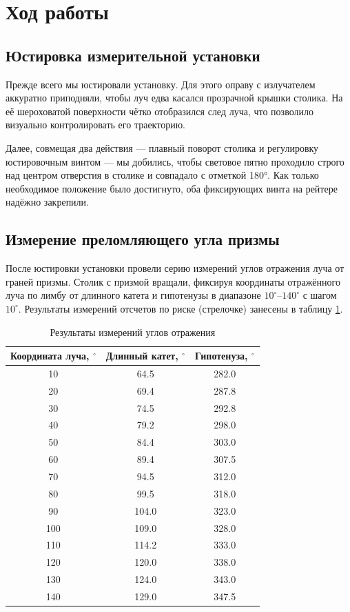 \section{Ход работы}

\subsection{Юстировка измерительной установки}

Прежде всего мы юстировали установку. Для этого оправу с излучателем аккуратно приподняли, чтобы луч едва касался прозрачной крышки столика. На её шероховатой поверхности чётко отобразился след луча, что позволило визуально контролировать его траекторию.

Далее, совмещая два действия — плавный поворот столика и регулировку юстировочным винтом — мы добились, чтобы световое пятно проходило строго над центром отверстия в столике и совпадало с отметкой 180°. Как только необходимое положение было достигнуто, оба фиксирующих винта на рейтере надёжно закрепили.

\subsection{Измерение преломляющего угла призмы}  
После юстировки установки провели серию измерений углов отражения луча от граней призмы. Столик с призмой вращали, фиксируя координаты отражённого луча по лимбу от длинного катета и гипотенузы в диапазоне \(10^\circ\)–\(140^\circ\) с шагом \(10^\circ\). Результаты измерений отсчетов по риске (стрелочке) занесены в таблицу \ref{tab:prism-angle}.

\begin{longtable}[c]{|c|c|c|}
\caption{Результаты измерений углов отражения}
\label{tab:prism-angle}\\
\hline
\textbf{Координата луча, \(^\circ\)} & \textbf{Длинный катет, \(^\circ\)} & \textbf{Гипотенуза, \(^\circ\)} \\ \hline 
\endfirsthead
%
\endhead
%
10 & 64.5 & 282.0 \\ \hline
20 & 69.4 & 287.8 \\ \hline
30 & 74.5 & 292.8 \\ \hline
40 & 79.2 & 298.0 \\ \hline
50 & 84.4 & 303.0 \\ \hline
60 & 89.4 & 307.5 \\ \hline
70 & 94.5 & 312.0 \\ \hline
80 & 99.5 & 318.0 \\ \hline
90 & 104.0 & 323.0 \\ \hline
100 & 109.0 & 328.0 \\ \hline
110 & 114.2 & 333.0 \\ \hline
120 & 120.0 & 338.0 \\ \hline
130 & 124.0 & 343.0 \\ \hline
140 & 129.0 & 347.5 \\ \hline
\end{longtable}

